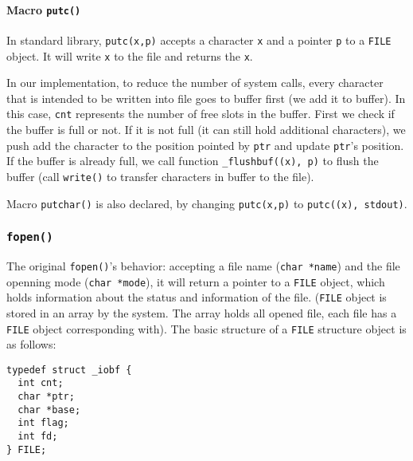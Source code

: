 \documentclass[11pt]{article}
\begin{document}
\paragraph{Macro \texttt{putc()}}
\label{sec:orge8ddb78}

In standard library, \texttt{putc(x,p)} accepts a character \texttt{x} and a pointer \texttt{p} to a \texttt{FILE} object. It will write \texttt{x} to the file and returns the \texttt{x}.

In our implementation, to reduce the number of system calls, every character that is intended to be written into file goes to buffer first (we add it to buffer). In this case, \texttt{cnt} represents the number of free slots in the buffer. First we check if the buffer is full or not. If it is not full (it can still hold additional characters), we push add the character to the position pointed by \texttt{ptr} and update \texttt{ptr}'s position. If the buffer is already full, we call function \texttt{\_flushbuf((x), p)} to flush the buffer (call \texttt{write()} to transfer characters in buffer to the file).

Macro \texttt{putchar()} is also declared, by changing \texttt{putc(x,p)} to \texttt{putc((x), stdout)}.

\subsubsection{\texttt{fopen()}}
\label{sec:org0ba7cae}
The original \texttt{fopen()}'s behavior: accepting a file name (\texttt{char *name}) and the file openning mode (\texttt{char *mode}), it will return a pointer to a \texttt{FILE} object, which holds information about the status and information of the file. (\texttt{FILE} object is stored in an array by the system. The array holds all opened file, each file has a \texttt{FILE} object corresponding with). The basic structure of a \texttt{FILE} structure object is as follows:
\begin{verbatim}
typedef struct _iobf {
  int cnt;
  char *ptr;
  char *base;
  int flag;
  int fd;
} FILE;
\end{verbatim}
\end{document}

